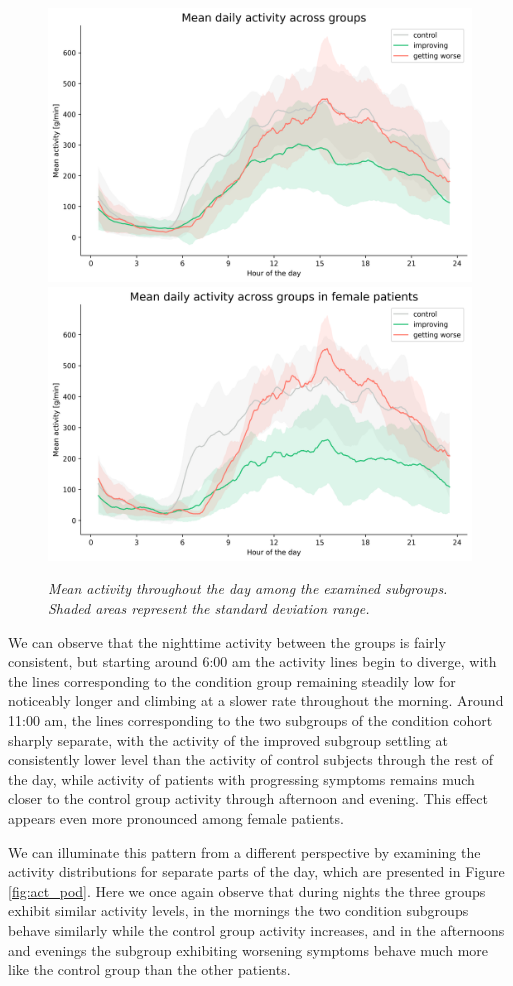 \documentclass[12pt]{article}
\begin{document}
\begin{figure}[!t]
    \centering
    \includegraphics[width=.75\textwidth]{images/mean_act_agg.png}
    \includegraphics[width=.75\textwidth]{images/mean_act_agg_fe.png}
    \captionsetup{justification=centering}
    \caption{\textit{Mean activity throughout the day among the examined subgroups. Shaded areas represent the standard deviation range.}}
    \label{fig:daily_act_agg}
\end{figure}

We can observe that the nighttime activity between the groups is fairly consistent, but starting around 6:00 am the activity lines begin to diverge, with the lines corresponding to the condition group remaining steadily low for noticeably longer and climbing at a slower rate throughout the morning. Around 11:00 am, the lines corresponding to the two subgroups of the condition cohort sharply separate, with the activity of the improved subgroup settling at consistently lower level than the activity of control subjects through the rest of the day, while activity of patients with progressing symptoms remains much closer to the control group activity through afternoon and evening. This effect appears even more pronounced among female patients.

We can illuminate this pattern from a different perspective by examining the activity distributions for separate parts of the day, which are presented in Figure \ref{fig:act_pod}. Here we once again observe that during nights the three groups exhibit similar activity levels, in the mornings the two condition subgroups behave similarly while the control group activity increases, and in the afternoons and evenings the subgroup exhibiting worsening symptoms behave much more like the control group than the other patients.
\end{document}
